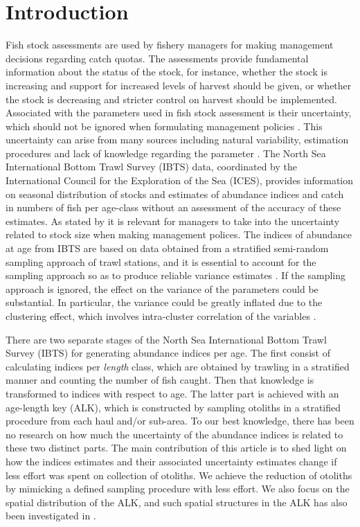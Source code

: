 \documentclass[a4paper 12pt]{article}
\numberwithin{equation}{section}
\begin{document}
\section{Introduction}
Fish stock assessments are used by fishery managers for making management decisions regarding catch quotas. The assessments provide fundamental information about the status of the stock, for instance, whether the stock is increasing and support for increased levels of harvest should be given, or whether the stock is decreasing and stricter control on harvest should be implemented. Associated with the parameters used in fish stock assessment is their uncertainty, which should not be ignored when formulating management policies \citep{walters1981effects, ludwig1981measurement, berg2014evaluation}. This uncertainty can arise from many sources including natural variability, estimation procedures and lack of knowledge regarding the parameter \citep{ehrhardt1997role}. The North Sea International Bottom Trawl Survey (IBTS) data, coordinated by the International Council for the Exploration of the Sea (ICES), provides information on seasonal distribution of stocks and estimates of abundance indices and catch in numbers of fish per age-class without an assessment of the accuracy of these estimates. As stated by \citet{ludwig1981measurement} it is relevant for managers to take into the uncertainty related to stock size when making management polices. The indices of abundance at age from IBTS  are based on data obtained from a stratified semi-random sampling approach of trawl stations,  and  it is essential to account for the sampling approach so as to produce reliable variance estimates \citep{lehtonen2004practical}. If the sampling approach is ignored, the effect on the variance  of the parameters could be substantial.  In particular, the variance could be greatly inflated  due to the clustering effect, which involves intra-cluster correlation of the variables \citep{aanes2015efficient, lehtonen2004practical}. 

There are two separate stages of the North Sea International Bottom Trawl Survey (IBTS) for generating abundance indices per age.  The first consist of calculating indices per \textit{length} class, which are obtained by trawling in a stratified manner and counting the number of fish caught. Then that knowledge is transformed to indices with respect to age. The latter part is achieved with an age-length key (ALK), which is constructed by sampling otoliths in a stratified procedure from each haul and/or sub-area. To our best knowledge, there has been no research on how much the uncertainty of the abundance indices is related to these two distinct parts. The main contribution of this article is to shed light on how the indices estimates and their associated uncertainty estimates change if less effort was spent on collection of otoliths. We achieve the reduction of otoliths by mimicking a defined sampling procedure with less effort. We also focus on the spatial distribution of the ALK, and such spatial structures in the ALK has also been investigated in \citet{berg2012spatial, hirst2012bayesian}.
\end{document}
